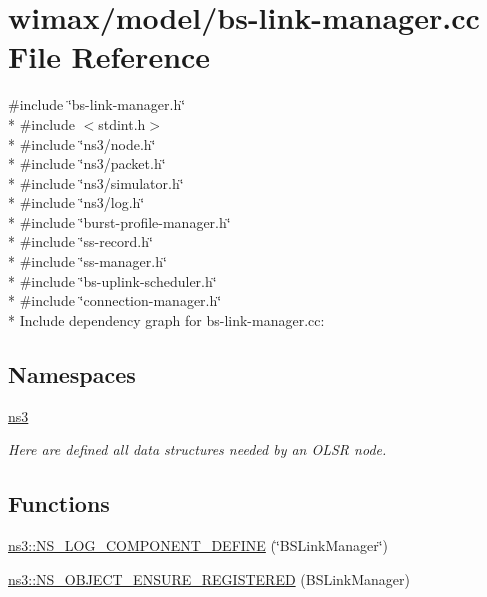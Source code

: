 \hypertarget{bs-link-manager_8cc}{}\section{wimax/model/bs-\/link-\/manager.cc File Reference}
\label{bs-link-manager_8cc}
{\ttfamily \#include \char`\"{}bs-\/link-\/manager.\+h\char`\"{}}\\*
{\ttfamily \#include $<$stdint.\+h$>$}\\*
{\ttfamily \#include \char`\"{}ns3/node.\+h\char`\"{}}\\*
{\ttfamily \#include \char`\"{}ns3/packet.\+h\char`\"{}}\\*
{\ttfamily \#include \char`\"{}ns3/simulator.\+h\char`\"{}}\\*
{\ttfamily \#include \char`\"{}ns3/log.\+h\char`\"{}}\\*
{\ttfamily \#include \char`\"{}burst-\/profile-\/manager.\+h\char`\"{}}\\*
{\ttfamily \#include \char`\"{}ss-\/record.\+h\char`\"{}}\\*
{\ttfamily \#include \char`\"{}ss-\/manager.\+h\char`\"{}}\\*
{\ttfamily \#include \char`\"{}bs-\/uplink-\/scheduler.\+h\char`\"{}}\\*
{\ttfamily \#include \char`\"{}connection-\/manager.\+h\char`\"{}}\\*
Include dependency graph for bs-\/link-\/manager.cc\+:
\subsection*{Namespaces}
\begin{DoxyCompactItemize}
\item 
 \hyperlink{namespacens3}{ns3}
\begin{DoxyCompactList}\small\item\em Here are defined all data structures needed by an O\+L\+SR node. \end{DoxyCompactList}\end{DoxyCompactItemize}
\subsection*{Functions}
\begin{DoxyCompactItemize}
\item 
\hyperlink{namespacens3_ae377cff33a3c3f08e2bc67958774230a}{ns3\+::\+N\+S\+\_\+\+L\+O\+G\+\_\+\+C\+O\+M\+P\+O\+N\+E\+N\+T\+\_\+\+D\+E\+F\+I\+NE} (\char`\"{}B\+S\+Link\+Manager\char`\"{})
\item 
\hyperlink{namespacens3_ad2470a8a6c7c5ecb27c9c49508de503d}{ns3\+::\+N\+S\+\_\+\+O\+B\+J\+E\+C\+T\+\_\+\+E\+N\+S\+U\+R\+E\+\_\+\+R\+E\+G\+I\+S\+T\+E\+R\+ED} (B\+S\+Link\+Manager)
\end{DoxyCompactItemize}
